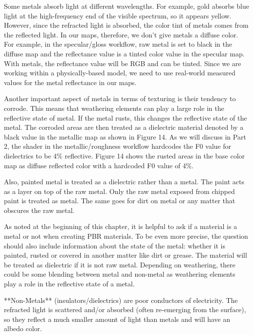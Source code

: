             Some metals absorb light at different wavelengths. For example, gold absorbs blue light at the high-frequency end of
            the visible spectrum, so it appears yellow. However, since the refracted light is absorbed, the color tint of metals comes
            from the reflected light. In our maps, therefore, we don’t give metals a diffuse color. For example, in the specular/gloss
            workflow, raw metal is set to black in the diffuse map and the reflectance value is a tinted color value in the specular
            map. With metals, the reflectance value will be RGB and can be tinted. Since we are working within a physically-based
            model, we need to use real-world measured values for the metal reflectance in our maps.
            
            Another important aspect of metals in terms of texturing is their tendency to corrode. This means that weathering elements
            can play a large role in the reflective state of metal. If the metal rusts, this changes the reflective state of the metal.
            The corroded areas are then treated as a dielectric material denoted by a black value in the metallic map as shown in Figure
            14. As we will discuss in Part 2, the shader in the metallic/roughness workflow hardcodes the F0 value for dielectrics to be
            4\% reflective. Figure 14 shows the rusted areas in the base color map as diffuse reflected color with a hardcoded F0 value
            of 4\%.
            
            Also, painted metal is treated as a dielectric rather than a metal. The paint acts as a layer on top of the raw metal. Only
            the raw metal exposed from chipped paint is treated as metal. The same goes for dirt on metal or any matter that obscures the
            raw metal.
            
            As noted at the beginning of this chapter, it is helpful to ask if a material is a metal or not when creating PBR materials.
            To be even more precise, the question should also include information about the state of the metal: whether it is painted,
            rusted or covered in another matter like dirt or grease. The material will be treated as dielectric if it is not raw metal.
            Depending on weathering, there could be some blending between metal and non-metal as weathering elements play a role in the
            reflective state of a metal.
            
            **Non-Metals** (insulators/dielectrics) are poor conductors of electricity. The refracted light is scattered and/or absorbed
            (often re-emerging from the surface), so they reflect a much smaller amount of light than metals and will have an albedo color.
            
